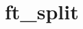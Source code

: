 \chapter{ft\+\_\+split}
\hypertarget{md_Documentation_2ft__split}{}\label{md_Documentation_2ft__split}

